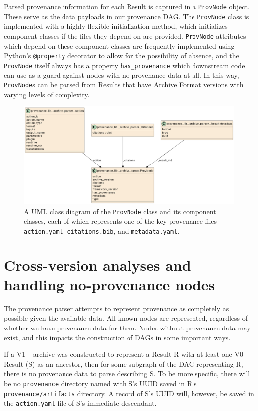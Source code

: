 Parsed provenance information for each Result is captured in a \texttt{ProvNode} object.
These serve as the data payloads in our provenance DAG. The \texttt{ProvNode} class is
implemented with a highly flexible initialization method, which initializes
component classes if the files they depend on are provided. \texttt{ProvNode} attributes
which depend on these component classes are frequently implemented using
Python’s \texttt{@property} decorator to allow for the possibility of absence, and the
\texttt{ProvNode} itself always has a property \texttt{has\_provenance} which downstream code can
use as a guard against nodes with no provenance data at all. In this way,
\texttt{ProvNode}s can be parsed from Results that have Archive Format versions with
varying levels of complexity. 

\begin{figure}[htp]
\centering
\includegraphics[width=\textwidth]{figures/ProvNode_UML.png}
\caption[UML Class diagram of the ProvNode class and its components]%
{A UML class diagram of the \texttt{ProvNode} class and its component classes, each of
which represents one of the key provenance files - \texttt{action.yaml}, \texttt{citations.bib},
and \texttt{metadata.yaml}.}
\label{fig:ProvNode_UML}
\end{figure}

\section{Cross-version analyses and handling no-provenance nodes}

The provenance parser attempts to represent provenance as completely as possible
given the available data. All known nodes are represented, regardless of whether
we have provenance data for them. Nodes without provenance data may exist, and
this impacts the construction of DAGs in some important ways.

If a V1+ archive was constructed to represent a Result R with at least one V0
Result (S) as an ancestor, then for some subgraph of the DAG representing R,
there is no provenance data to parse describing S. To be more specific, there
will be no \texttt{provenance} directory named with S’s UUID saved in R’s
\texttt{provenance/artifacts} directory. A record of S’s UUID will, however, be saved in
the \texttt{action.yaml} file of S’s immediate descendant.

